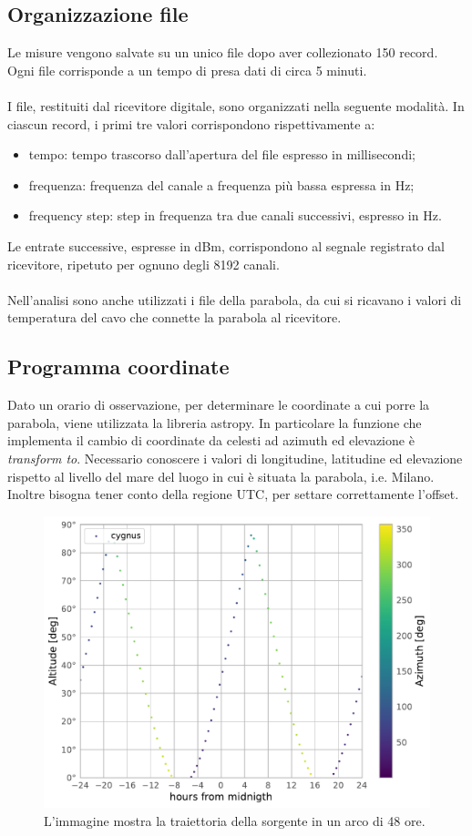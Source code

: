 \subsection{Organizzazione file}
Le misure vengono salvate su un unico file dopo aver collezionato 150 record. Ogni file corrisponde a un tempo di presa dati di circa 5 minuti.
\\\\
I file, restituiti dal ricevitore digitale, sono organizzati nella seguente modalità. In ciascun record, i primi tre valori corrispondono rispettivamente a:
\begin{itemize}
\item tempo: tempo trascorso dall'apertura del file espresso in millisecondi;
\item frequenza: frequenza del canale a frequenza più bassa espressa in Hz;
\item frequency step: step in frequenza tra due canali successivi, espresso in Hz.
\end{itemize}
Le entrate successive, espresse in dBm, corrispondono al segnale registrato dal ricevitore, ripetuto per ognuno degli 8192 canali.
\\\\
Nell'analisi sono anche utilizzati i file della parabola, da cui si ricavano i valori di temperatura del cavo che connette la parabola al ricevitore. %


\subsection{Programma coordinate}
\label{Programma coordinate}
Dato un orario di osservazione, per determinare le coordinate a cui porre la parabola, viene utilizzata la libreria astropy. In particolare la funzione che implementa il cambio di coordinate da celesti ad azimuth ed elevazione è \textit{transform to}.  Necessario conoscere i valori di longitudine, latitudine ed elevazione rispetto al livello del mare del luogo in cui è situata la parabola, i.e. Milano. Inoltre bisogna tener conto della regione UTC, per settare correttamente l'offset. 

\begin{figure}[h]
\includegraphics[scale=0.60]{Coordinate.pdf}
\centering
\caption{L'immagine mostra la traiettoria della sorgente in un arco di 48 ore.}
\label{fig:Coordinate}
\end{figure}
